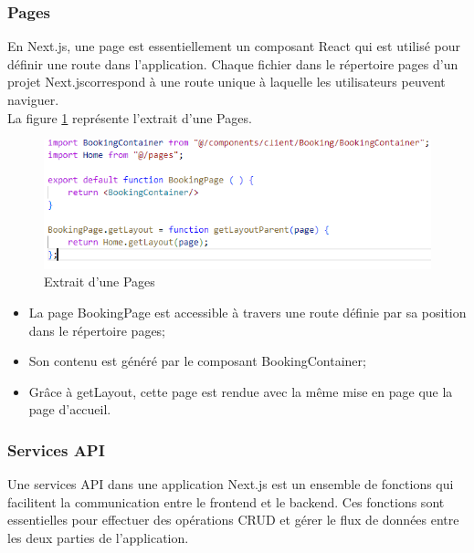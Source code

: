 \documentclass[12pt]{report}
\begin{document}
			\subsubsection{Pages}
			\hspace{15pt} En Next.js, une page est essentiellement un composant React qui est utilisé pour définir une route dans l'application. Chaque fichier dans le répertoire pages d'un projet Next.jscorrespond à une route unique à laquelle les utilisateurs peuvent naviguer.\\
			
			La figure \ref{fig:pages} représente l'extrait d'une Pages.
			
			\begin{figure}[h]
				\centering
				\includegraphics[width=\textwidth]{pages.jpg}
				\caption{Extrait d'une Pages}
				\label{fig:pages}
			\end{figure}
			\FloatBarrier

			\begin{itemize}
				\item La page BookingPage est accessible à travers une route définie par sa position dans le répertoire pages;
				\item Son contenu est généré par le composant BookingContainer;
				\item Grâce à getLayout, cette page est rendue avec la même mise en page que la page d'accueil.
 			\end{itemize}

			\subsubsection{Services API}

			\hspace{15pt} Une services API dans une application Next.js est un ensemble de fonctions qui facilitent la communication entre le frontend et le backend. Ces fonctions sont essentielles pour effectuer des opérations CRUD et gérer le flux de données entre les deux parties de l'application.\\
\end{document}

